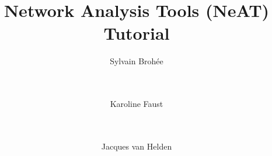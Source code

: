 \documentclass{book}
\begin{document}
\title{Network Analysis Tools (NeAT) \\
Tutorial}

\author{
	Sylvain Broh\'ee \\
	 \\
        \and \\
	Karoline Faust \\
	 \\
        \and \\
	Jacques van Helden \\
	\\
        \\
        \\
        \bigre 
}



\maketitle

\newpage
\tableofcontents
\newpage






\end{document}
